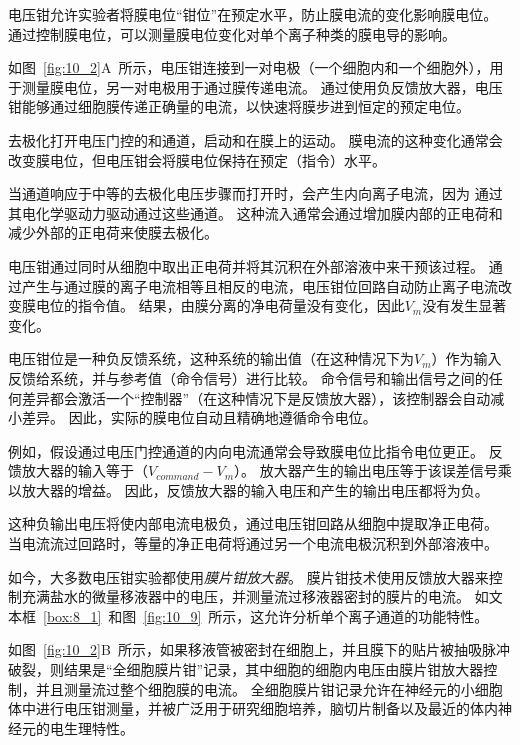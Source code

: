 \begin{proposition}[电压钳技术] \label{box:10_1}
	
	\quad \quad 电压钳允许实验者将膜电位“钳位”在预定水平，防止膜电流的变化影响膜电位。
	通过控制膜电位，可以测量膜电位变化对单个离子种类的膜电导的影响。
	
	\quad \quad 如图~\ref{fig:10_2}A~所示，电压钳连接到一对电极（一个细胞内和一个细胞外），用于测量膜电位，另一对电极用于通过膜传递电流。
	通过使用负反馈放大器，电压钳能够通过细胞膜传递正确量的电流，以快速将膜步进到恒定的预定电位。
	
	\quad \quad 去极化打开电压门控的和通道，启动和在膜上的运动。
	膜电流的这种变化通常会改变膜电位，但电压钳会将膜电位保持在预定（指令）水平。
	
	\quad \quad 当通道响应于中等的去极化电压步骤而打开时，会产生内向离子电流，因为  通过其电化学驱动力驱动通过这些通道。
	这种流入通常会通过增加膜内部的正电荷和减少外部的正电荷来使膜去极化。
	
	\quad \quad 电压钳通过同时从细胞中取出正电荷并将其沉积在外部溶液中来干预该过程。
	通过产生与通过膜的离子电流相等且相反的电流，电压钳位回路自动防止离子电流改变膜电位的指令值。
	结果，由膜分离的净电荷量没有变化，因此$V_m$没有发生显著变化。
	
	\quad \quad 电压钳位是一种负反馈系统，这种系统的输出值（在这种情况下为$V_m$）作为输入反馈给系统，并与参考值（命令信号）进行比较。
	命令信号和输出信号之间的任何差异都会激活一个“控制器”（在这种情况下是反馈放大器），该控制器会自动减小差异。
	因此，实际的膜电位自动且精确地遵循命令电位。
	
	\quad \quad 例如，假设通过电压门控通道的内向电流通常会导致膜电位比指令电位更正。
	反馈放大器的输入等于（$V_{command}-V_m$）。
	放大器产生的输出电压等于该误差信号乘以放大器的增益。
	因此，反馈放大器的输入电压和产生的输出电压都将为负。
	
	\quad \quad 这种负输出电压将使内部电流电极负，通过电压钳回路从细胞中提取净正电荷。
	当电流流过回路时，等量的净正电荷将通过另一个电流电极沉积到外部溶液中。
	
	\quad \quad 如今，大多数电压钳实验都使用\textit{膜片钳放大器}。
	膜片钳技术使用反馈放大器来控制充满盐水的微量移液器中的电压，并测量流过移液器密封的膜片的电流。
	如文本框~\ref{box:8_1}~和图~\ref{fig:10_9}~所示，这允许分析单个离子通道的功能特性。
	
	\quad \quad 如图~\ref{fig:10_2}B~所示，如果移液管被密封在细胞上，并且膜下的贴片被抽吸脉冲破裂，则结果是“全细胞膜片钳”记录，其中细胞的细胞内电压由膜片钳放大器控制，并且测量流过整个细胞膜的电流。
	全细胞膜片钳记录允许在神经元的小细胞体中进行电压钳测量，并被广泛用于研究细胞培养，脑切片制备以及最近的体内神经元的电生理特性。
	
\end{proposition}



